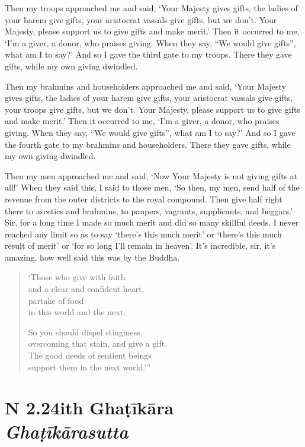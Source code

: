 \documentclass[12pt,openany]{book}%
\newcommand*{\suttatitleacronym}[1]{\smaller[2]{#1}\vspace*{.3em}}
\newcommand*{\suttatitletranslation}[1]{\linebreak{#1}}
\newcommand*{\suttatitleroot}[1]{\linebreak\smaller[2]\itshape{#1}}
\newcommand*{\tocacronym}[1]{\hspace*{-3.3em}{#1}\quad}
\newcommand*{\toctranslation}[1]{#1}
\newcommand*{\tocroot}[1]{(\textit{#1})}
\begin{document}
Then my troops approached me and said, ‘Your Majesty gives gifts, the ladies of your harem give gifts, your aristocrat vassals give gifts, but we don’t. Your Majesty, please support us to give gifts and make merit.’ Then it occurred to me, ‘I’m a giver, a donor, who praises giving. When they say, “We would give gifts”, what am I to say?’ And so I gave the third gate to my troops. There they gave gifts, while my own giving dwindled. 

Then my brahmins and householders approached me and said, ‘Your Majesty gives gifts, the ladies of your harem give gifts, your aristocrat vassals give gifts, your troops give gifts, but we don’t. Your Majesty, please support us to give gifts and make merit.’ Then it occurred to me, ‘I’m a giver, a donor, who praises giving. When they say, “We would give gifts”, what am I to say?’ And so I gave the fourth gate to my brahmins and householders. There they gave gifts, while my own giving dwindled. 

Then my men approached me and said, ‘Now Your Majesty is not giving gifts at all!’ When they said this, I said to those men, ‘So then, my men, send half of the revenue from the outer districts to the royal compound. Then give half right there to ascetics and brahmins, to paupers, vagrants, supplicants, and beggars.’ Sir, for a long time I made so much merit and did so many skillful deeds. I never reached any limit so as to say ‘there’s this much merit’ or ‘there’s this much result of merit’ or ‘for so long I’ll remain in heaven’. It’s incredible, sir, it’s amazing, how well said this was by the Buddha. 

\begin{verse}%
‘Those who give with faith \\
and a clear and confident heart, \\
partake of food \\
in this world and the next. 

So you should dispel stinginess, \\
overcoming that stain, and give a gift. \\
The good deeds of sentient beings \\
support them in the next world.’” 

%
\end{verse}

%
\section*{{\suttatitleacronym SN 2.24}{\suttatitletranslation With Ghaṭīkāra }{\suttatitleroot Ghaṭīkārasutta}}
\addcontentsline{toc}{section}{\tocacronym{SN 2.24} \toctranslation{With Ghaṭīkāra } \tocroot{Ghaṭīkārasutta}}
\end{document}
